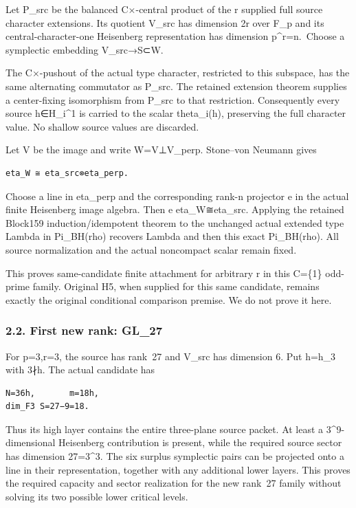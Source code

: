 Let P\_src be the balanced C×-central product of the r supplied full
source character extensions. Its quotient V\_src has dimension 2r over
F\_p and its central-character-one Heisenberg representation has
dimension p\^{}r=n.~Choose a symplectic embedding V\_src→S⊂W.

The C×-pushout of the actual type character, restricted to this
subspace, has the same alternating commutator as P\_src. The retained
extension theorem supplies a center-fixing isomorphism from P\_src to
that restriction. Consequently every source h∈H\_i\^{}1 is carried to
the scalar theta\_i(h), preserving the full character value. No shallow
source values are discarded.

Let V be the image and write W=V⊥V\_perp. Stone--von Neumann gives

\begin{Verbatim}[fontsize=\small,breaklines=true,breakanywhere=true]
eta_W ≅ eta_src⊗eta_perp.
\end{Verbatim}

Choose a line in eta\_perp and the corresponding rank-n projector e in
the actual finite Heisenberg image algebra. Then e eta\_W≅eta\_src.
Applying the retained Block159 induction/idempotent theorem to the
unchanged actual extended type Lambda in Pi\_BH(rho) recovers Lambda and
then this exact Pi\_BH(rho). All source normalization and the actual
noncompact scalar remain fixed.

This proves same-candidate finite attachment for arbitrary r in this
C=\{1\} odd-prime family. Original H5, when supplied for this same
candidate, remains exactly the original conditional comparison premise.
We do not prove it here.

\hypertarget{odd_capacity-first-new-rank-gl_27}{%
\subsubsection{2.2. First new rank: GL\_27}\label{odd_capacity-first-new-rank-gl_27}}

For p=3,r=3, the source has rank~27 and V\_src has dimension 6. Put h=h\_3
with 3∤h. The actual candidate has

\begin{Verbatim}[fontsize=\small,breaklines=true,breakanywhere=true]
N=36h,       m=18h,
dim_F3 S=27−9=18.
\end{Verbatim}

Thus its high layer contains the entire three-plane source packet. At
least a 3\^{}9-dimensional Heisenberg contribution is present, while the
required source sector has dimension 27=3\^{}3. The six surplus
symplectic pairs can be projected onto a line in their representation,
together with any additional lower layers. This proves the required
capacity and sector realization for the new rank~27 family without
solving its two possible lower critical levels.

